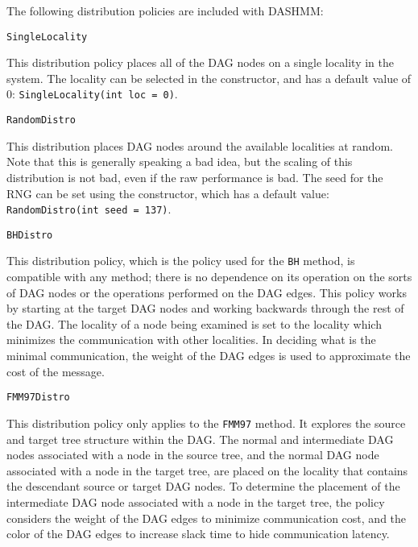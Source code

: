 The following distribution policies are included with DASHMM:

\begin{lstlisting}
SingleLocality
\end{lstlisting}

\noindent This distribution policy places all of the DAG nodes on a single
locality in the system. The locality can be selected in the constructor, and
has a default value of 0: \texttt{SingleLocality(int loc = 0)}.

\begin{lstlisting}
RandomDistro
\end{lstlisting}

\noindent This distribution places DAG nodes around the available localities at
random. Note that this is generally speaking a bad idea, but the scaling of
this distribution is not bad, even if the raw performance is bad. The seed for
the RNG can be set using the constructor, which has a default value:
\texttt{RandomDistro(int seed = 137)}.

\begin{lstlisting}
BHDistro
\end{lstlisting}

\noindent This distribution policy, which is the policy used for the
\texttt{BH} method, is compatible with any method; there is no dependence on
its operation on the sorts of DAG nodes or the operations performed on the DAG
edges. This policy works by starting at the target DAG nodes and working
backwards through the rest of the DAG. The locality of a node being examined is
set to the locality which minimizes the communication with other localities.
In deciding what is the minimal communication, the weight of the DAG edges is
used to approximate the cost of the message.

\begin{lstlisting}
FMM97Distro
\end{lstlisting}

\noindent This distribution policy only applies to the \texttt{FMM97} method.
It explores the source and target tree structure within the DAG. The normal
and intermediate DAG nodes associated with a node in the source tree, and
the normal DAG node associated with a node in the target tree, are placed on
the locality that contains the descendant source or target DAG nodes. To
determine the placement of the intermediate DAG node associated with a node
in the target tree, the policy considers the weight of the DAG edges to
minimize communication cost, and the color of the DAG edges to increase slack
time to hide communication latency.


